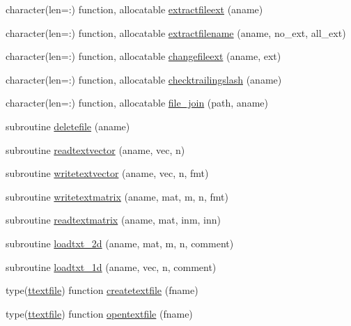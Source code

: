 \begin{DoxyCompactItemize}
\item 
character(len=\+:) function, allocatable \mbox{\hyperlink{namespacefileutils_a58b75841484f583d4f7da47c8fa217b6}{extractfileext}} (aname)
\item 
character(len=\+:) function, allocatable \mbox{\hyperlink{namespacefileutils_a3a05468f7b2b38570ebb0f21256d2bfb}{extractfilename}} (aname, no\+\_\+ext, all\+\_\+ext)
\item 
character(len=\+:) function, allocatable \mbox{\hyperlink{namespacefileutils_a54603adc7cf7864b6f4fe0e3d2b951d3}{changefileext}} (aname, ext)
\item 
character(len=\+:) function, allocatable \mbox{\hyperlink{namespacefileutils_a61ab2a304f35a84f39731548b11393a2}{checktrailingslash}} (aname)
\item 
character(len=\+:) function, allocatable \mbox{\hyperlink{namespacefileutils_abc59cd6627541557f05e51e8571b77d6}{file\+\_\+join}} (path, aname)
\item 
subroutine \mbox{\hyperlink{namespacefileutils_a4123c8130fff81627f5a0bdd7674d6f7}{deletefile}} (aname)
\item 
subroutine \mbox{\hyperlink{namespacefileutils_ab6b6b5446754f42206e21485cb75e539}{readtextvector}} (aname, vec, n)
\item 
subroutine \mbox{\hyperlink{namespacefileutils_abd621ad851fccd7a5f79146e2841c380}{writetextvector}} (aname, vec, n, fmt)
\item 
subroutine \mbox{\hyperlink{namespacefileutils_a9620c143afd6e00aa410fb9e0f5bad25}{writetextmatrix}} (aname, mat, m, n, fmt)
\item 
subroutine \mbox{\hyperlink{namespacefileutils_a34de05bb4524587b63bb0eb4bebd6e4a}{readtextmatrix}} (aname, mat, inm, inn)
\item 
subroutine \mbox{\hyperlink{namespacefileutils_aefd4b6f83e21fff9ab97894279daaecb}{loadtxt\+\_\+2d}} (aname, mat, m, n, comment)
\item 
subroutine \mbox{\hyperlink{namespacefileutils_ac5c5aa9cef807fcc118234407f98b422}{loadtxt\+\_\+1d}} (aname, vec, n, comment)
\item 
type(\mbox{\hyperlink{structfileutils_1_1ttextfile}{ttextfile}}) function \mbox{\hyperlink{namespacefileutils_a64381cf183dd4f3ab198ebe7d87b1745}{createtextfile}} (fname)
\item 
type(\mbox{\hyperlink{structfileutils_1_1ttextfile}{ttextfile}}) function \mbox{\hyperlink{namespacefileutils_a12160238f4fcdecaed130c680db7405a}{opentextfile}} (fname)
\end{DoxyCompactItemize}

